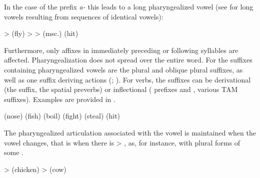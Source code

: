 In the case of the  prefix \textit{a-} this leads to a long pharyngealized vowel (see  for long vowels resulting from sequences of identical vowels):

\begin{exe}
	\ex	\label{ex:pharyngealization long vowel}
\begin{xlist}
\ex	{} >   (fly)
\ex	{} >  >   (msc.) (hit)
	\end{xlist}
\end{exe}	


Furthermore, only affixes in immediately preceding or following syllables are affected. Pharyngealization does not spread over the entire word. For  the suffixes containing pharyngealized vowels are the plural and oblique plural suffixes, as well as one suffix deriving actions  (; ). For verbs, the suffixes can be derivational (the  suffix, the spatial preverbs) or inflectional ( prefixes  and , various TAM suffixes). Examples are provided in .
%
\begin{exe}
	\ex	\label{ex:pharyngealization spread phon}
\begin{xlist}
		\ex {}  (nose)	
		\ex {}  (fish)
		\ex {}  (boil)	
		\ex {}  (fight) 
		\ex {}  (steal)	
		\ex	{}  (hit)
\end{xlist}
\end{exe}

The pharyngealized articulation associated with the vowel is maintained when the vowel changes, that is when there is   > , as, for instance, with plural forms of some  .
%
\begin{exe}
	\ex	\label{ex:vowel mutation plural phon}
	\begin{xlist}
		\ex	{}  >   (chicken)
		\ex	{}  >   (cow)
	\end{xlist}
\end{exe}

